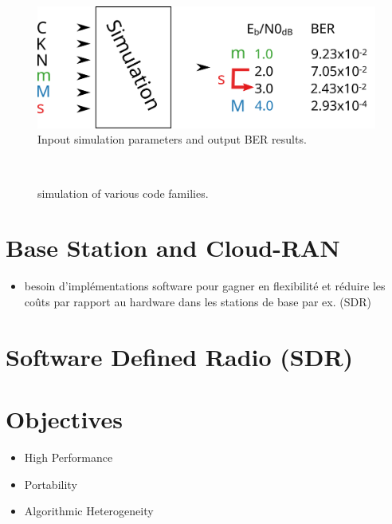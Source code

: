 \begin{figure}
  \centering
  \includegraphics[width=0.70\linewidth]{simu/in_out}
  \caption{Inpout simulation parameters and output BER results.}
  \label{fig:intro_in_out}
\end{figure}

\begin{figure}[htp]
  \centering
    \quad{}
     \quad{}
    \\
      \quad{}
   \quad{}
  \caption{\AFFECT simulation of various code families.}
  \label{fig:intro_bfer}
\end{figure}

\section{Base Station and Cloud-RAN}

\begin{itemize}
  \item besoin d'implémentations software pour gagner en flexibilité et réduire
    les coûts par rapport au hardware dans les stations de base par ex. (SDR)
\end{itemize}

\section{Software Defined Radio (SDR)}

\section{Objectives}

\begin{itemize}
  \item High Performance
  \item Portability
  \item Algorithmic Heterogeneity
\end{itemize}

